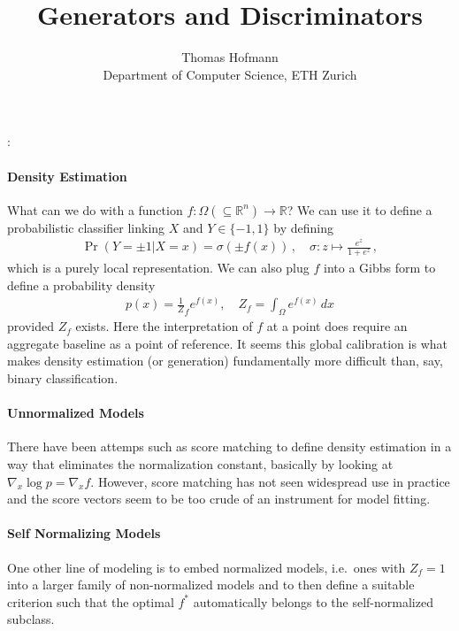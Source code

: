 \documentclass{article}
\title{
	Generators and Discriminators
}
\author{
	Thomas Hofmann \\[1mm] Department of Computer Science, ETH Zurich
}
\renewcommand{\Re}{{\mathbb R}}
\begin{document}
:
\maketitle 

\paragraph{Density Estimation} What can we do with a function $f: \Omega (\subseteq \Re^n)\to \Re$? We can use it to define a probabilistic classifier linking $X$ and $Y \in \{-1,1\}$ by defining 
\begin{align}
\Pr(Y = \pm 1 | X=x) = \sigma(\pm f(x))\,, \quad \sigma: z \mapsto \frac{e^z}{1+e^{z}}\,,
\end{align}
which is a purely local representation. We can also plug $f$ into a Gibbs form to define a probability density
\begin{align}
p(x) = \frac 1Z_{\!f} e^{f(x)}, \quad Z_f = \int_\Omega e^{f(x)} \,dx
\end{align} 
provided $Z_f$ exists. Here the interpretation of $f$ at a point does require an aggregate baseline as a point of reference. It seems this global calibration is what makes density estimation (or generation) fundamentally more difficult than, say, binary classification. 

\paragraph{Unnormalized Models} There have been attemps such as score matching \cite{hyvarinen2005estimation} to define density estimation in a way that eliminates the normalization constant, basically by looking at $\nabla_x \log p = \nabla_x f$. However, score matching has not seen widespread use in practice and the score vectors seem to be too crude of an instrument for model fitting.

\paragraph{Self Normalizing Models} One other line of modeling is to embed normalized models, i.e.~ones with $Z_{\!f}=1$ into a larger family of non-normalized models and to then define a suitable criterion such that the optimal $f^*$ automatically belongs to the self-normalized subclass. 



\end{document}
